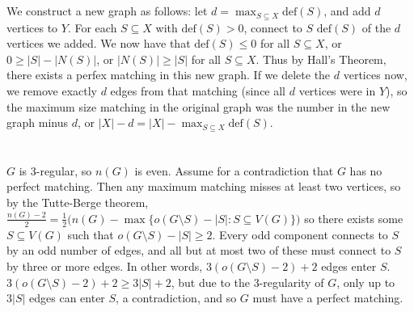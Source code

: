 \documentclass[11pt]{article}
\begin{document}
\renewcommand{\thesubsection}{\thesection.\alph{subsection}}

\section{} %
We construct a new graph as follows: let $d=\max_{S\subseteq X}\text{def}(S)$,
and add $d$ vertices to $Y$. For each $S\subseteq X$ with $\text{def}(S)>0$,
connect to $S$ $\text{def}(S)$ of the $d$ vertices we added. We now have that
$\text{def}(S)\le0$ for all $S\subseteq X$, or $0\ge|S|-|N(S)|$, or
$|N(S)|\ge|S|$ for all $S\subseteq X$. Thus by Hall's Theorem, there exists a
perfex matching in this new graph. If we delete the $d$ vertices now, we remove
exactly $d$ edges from that matching (since all $d$ vertices were in $Y$), so
the maximum size matching in the original graph was the number in the new graph
minus $d$, or $|X|-d=|X|-\max_{S\subseteq X}\text{def}(S)$.


\section{} %
$G$ is 3-regular, so $n(G)$ is even. Assume for a contradiction that $G$ has no
perfect matching. Then any maximum matching misses at least two vertices, so by
the Tutte-Berge theorem,
$\frac{n(G)-2}{2}=\frac{1}{2}\bigl(n(G)-\max\{o(G\setminus S)-|S|:S\subseteq V(G)\}\bigr)$
so there exists some $S\subseteq V(G)$ such that $o(G\setminus S)-|S|\ge2$.
Every odd component connects to $S$ by an odd number of edges, and all but at
most two of these must connect to $S$ by three or more edges. In other words,
$3(o(G\setminus S)-2)+2$ edges enter $S$.  $3(o(G\setminus S)-2)+2\ge3|S|+2$,
but due to the 3-regularity of $G$, only up to $3|S|$ edges can enter $S$, a
contradiction, and so $G$ must have a perfect matching.
\end{document}
